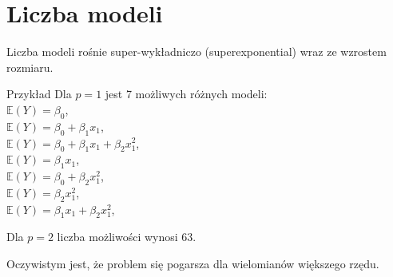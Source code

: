 \documentclass[a4paper]{beamer}
\begin{document}
\section{Liczba modeli}
\begin{frame}
\begin{block}{}
Liczba modeli rośnie super-wykładniczo (superexponential) wraz ze wzrostem rozmiaru.
\end{block}
\begin{block}{Przykład}
Dla $p=1$ jest 7 możliwych różnych modeli: \\
$\mathbb{E}(Y) = \beta_0$, \\
$\mathbb{E}(Y) = \beta_0 + \beta_1 x_1$, \\
$\mathbb{E}(Y) = \beta_0 + \beta_1 x_1 + \beta_2 x_1^2$, \\[0.3cm]


$\mathbb{E}(Y) = \beta_1 x_1$, \\
$\mathbb{E}(Y) = \beta_0 + \beta_2 x_1^2$, \\[0.3cm]


$\mathbb{E}(Y) = \beta_2 x_1^2$, \\
$\mathbb{E}(Y) = \beta_1 x_1 + \beta_2 x_1^2$, \\

\end{block}
\begin{block}{}
Dla $p=2$ liczba możliwości wynosi 63.
\end{block}
\begin{block}{}
Oczywistym jest, że problem się pogarsza dla wielomianów większego rzędu.
\end{block}
\end{frame}

\end{document}
